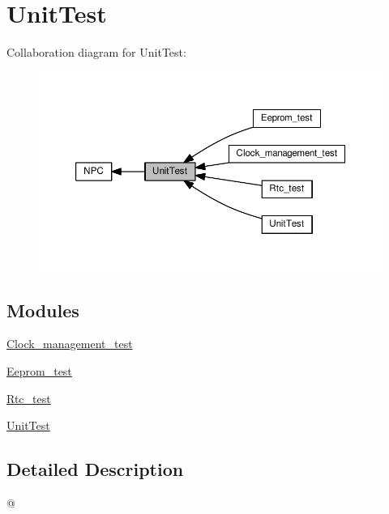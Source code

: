 \hypertarget{group___unit_test}{}\section{Unit\+Test}
\label{group___unit_test}
Collaboration diagram for Unit\+Test\+:\nopagebreak
\begin{figure}[H]
\begin{center}
\leavevmode
\includegraphics[width=350pt]{d5/d56/group___unit_test}
\end{center}
\end{figure}
\subsection*{Modules}
\begin{DoxyCompactItemize}
\item 
\hyperlink{group__clock__management__test}{Clock\+\_\+management\+\_\+test}
\item 
\hyperlink{group__eeprom__test}{Eeprom\+\_\+test}
\item 
\hyperlink{group__rtc__test}{Rtc\+\_\+test}
\item 
\hyperlink{group__unit_test}{Unit\+Test}
\end{DoxyCompactItemize}


\subsection{Detailed Description}
@ 